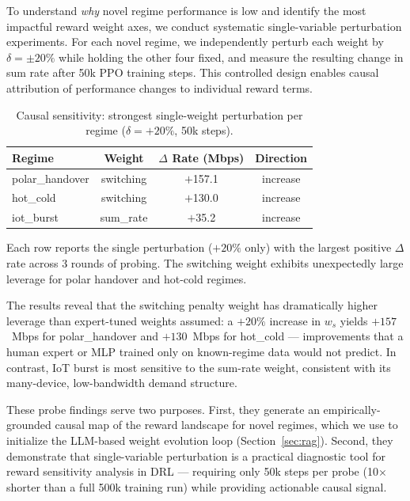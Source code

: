 \documentclass[conference]{IEEEtran}
\begin{document}
To understand \emph{why} novel regime performance is low and identify the most impactful reward weight axes, we conduct systematic single-variable perturbation experiments. For each novel regime, we independently perturb each weight by $\delta = \pm 20\%$ while holding the other four fixed, and measure the resulting change in sum rate after 50k PPO training steps. This controlled design enables causal attribution of performance changes to individual reward terms.

\begin{table}[t]
\centering
\caption{Causal sensitivity: strongest single-weight perturbation per regime ($\delta = +20\%$, 50k steps).}
\label{tab:probe}
\begin{tabular}{lccc}
\toprule
Regime & Weight & $\Delta$ Rate (Mbps) & Direction \\
\midrule
polar\_handover & switching & $+$157.1 & increase \\
hot\_cold       & switching & $+$130.0 & increase \\
iot\_burst      & sum\_rate & $+$35.2  & increase \\
\bottomrule
\end{tabular}
\vspace{2pt}
{\footnotesize Each row reports the single perturbation ($+20\%$ only) with the largest positive $\Delta$ rate across 3 rounds of probing. The switching weight exhibits unexpectedly large leverage for polar handover and hot-cold regimes.}
\end{table}

The results reveal that the switching penalty weight has dramatically higher leverage than expert-tuned weights assumed: a $+20\%$ increase in $w_s$ yields $+157$~Mbps for polar\_handover and $+130$~Mbps for hot\_cold --- improvements that a human expert or MLP trained only on known-regime data would not predict. In contrast, IoT burst is most sensitive to the sum-rate weight, consistent with its many-device, low-bandwidth demand structure.

These probe findings serve two purposes. First, they generate an empirically-grounded causal map of the reward landscape for novel regimes, which we use to initialize the LLM-based weight evolution loop (Section~\ref{sec:rag}). Second, they demonstrate that single-variable perturbation is a practical diagnostic tool for reward sensitivity analysis in DRL --- requiring only 50k steps per probe (10$\times$ shorter than a full 500k training run) while providing actionable causal signal.
\end{document}
